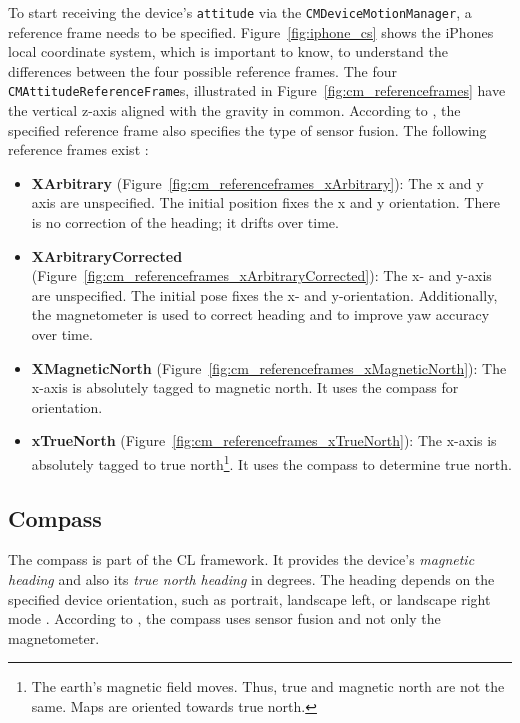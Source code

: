 To start receiving the device's \texttt{attitude} via the \texttt{CMDeviceMotionManager}, a reference frame needs to be specified. Figure~\ref{fig:iphone_cs} shows the iPhones local coordinate system, which is important to know, to understand the differences between the four possible reference frames. The four \texttt{CMAttitudeReferenceFrame}s, illustrated in Figure~\ref{fig:cm_referenceframes} have the vertical z-axis aligned with the gravity in common. According to \citet{apple:wwdc_2014_pham}, the specified reference frame also specifies the type of sensor fusion. The following reference frames exist \citep{apple:wwdc_2014_pham,apple:ios_doc_cm}:
\begin{itemize}
  \item \textbf{XArbitrary} (Figure~\ref{fig:cm_referenceframes_xArbitrary}): The x and y axis are unspecified. The initial position fixes the x and y orientation. There is no correction of the heading; it drifts over time.
  \item \textbf{XArbitraryCorrected} (Figure~\ref{fig:cm_referenceframes_xArbitraryCorrected}): The x- and y-axis are unspecified. The initial pose fixes the x- and y-orientation. Additionally, the magnetometer is used to correct heading and to improve yaw accuracy over time.
  \item \textbf{XMagneticNorth} (Figure~\ref{fig:cm_referenceframes_xMagneticNorth}): The x-axis is absolutely tagged to magnetic north. It uses the compass for orientation.
  \item \textbf{xTrueNorth} (Figure~\ref{fig:cm_referenceframes_xTrueNorth}): The x-axis is absolutely tagged to true north\footnote{The earth's magnetic field moves. Thus, true and magnetic north are not the same. Maps are oriented towards true north.}. It uses the compass to determine true north.
\end{itemize}



\subsection{Compass}
The compass is part of the \ac{CL} framework. It provides the device's \emph{magnetic heading} and also its \emph{true north heading} in degrees. The heading depends on the specified device orientation, such as portrait, landscape left, or landscape right mode \citep{apple:ios_doc_cl}. According to \citet{apple:wwdc_2012_pham}, the compass uses sensor fusion and not only the magnetometer.

